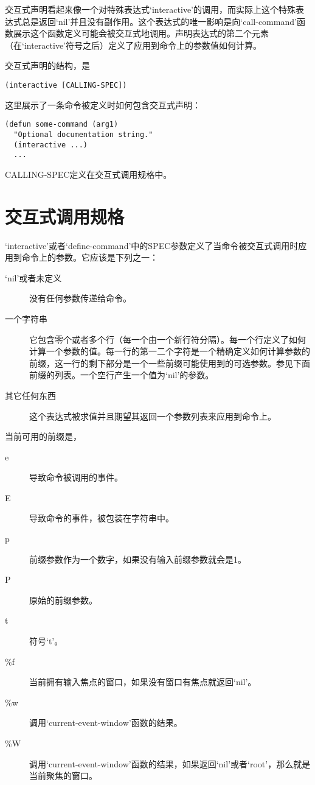 \documentclass{book}
\begin{document}
\begin{CJK*}{UTF8}{gbsn}
交互式声明看起来像一个对特殊表达式`interactive'的调用，而实际上这个特殊表达式总是返回`nil'并且没有副作用。这个表达式的唯一影响是向`call-command'函数展示这个函数定义可能会被交互式地调用。声明表达式的第二个元素（在`interactive'符号之后）定义了应用到命令上的参数值如何计算。

交互式声明的结构，是
\begin{verbatim}
(interactive [CALLING-SPEC])
\end{verbatim}
这里展示了一条命令被定义时如何包含交互式声明：
\begin{verbatim}
(defun some-command (arg1)
  "Optional documentation string."
  (interactive ...)
  ...
\end{verbatim}
CALLING-SPEC定义在交互式调用规格中。
\section{交互式调用规格}
`interactive'或者`define-command'中的SPEC参数定义了当命令被交互式调用时应用到命令上的参数。它应该是下列之一：
\begin{description}
\item[`nil'或者未定义] 没有任何参数传递给命令。
\item[一个字符串] 它包含零个或者多个行（每一个由一个新行符分隔）。每一个行定义了如何计算一个参数的值。每一行的第一二个字符是一个精确定义如何计算参数的前缀，这一行的剩下部分是一个一些前缀可能使用到的可选参数。参见下面前缀的列表。一个空行产生一个值为`nil'的参数。
\item[其它任何东西] 这个表达式被求值并且期望其返回一个参数列表来应用到命令上。
\end{description}

当前可用的前缀是，
\begin{description}
\item[e] 导致命令被调用的事件。
\item[E] 导致命令的事件，被包装在字符串中。
\item[p] 前缀参数作为一个数字，如果没有输入前缀参数就会是1。
\item[P] 原始的前缀参数。
\item[t] 符号`t'。
\item[\%f] 当前拥有输入焦点的窗口，如果没有窗口有焦点就返回`nil'。
\item[\%w] 调用`current-event-window'函数的结果。
\item[\%W] 调用`current-event-window'函数的结果，如果返回`nil'或者`root'，那么就是当前聚焦的窗口。
\end{description}

\end{CJK*}
\end{document}
